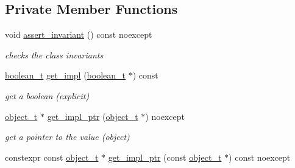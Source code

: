 \subsection*{Private Member Functions}
\begin{DoxyCompactItemize}
\item 
void \mbox{\hyperlink{classnlohmann_1_1basic__json_a4a82d3fb7a111641decf35c2fb707c7f}{assert\+\_\+invariant}} () const noexcept
\begin{DoxyCompactList}\small\item\em checks the class invariants \end{DoxyCompactList}\item 
\mbox{\label{classnlohmann_1_1basic__json_ac686d87a2261f85f1df97035b14a6e3a}} 
\mbox{\hyperlink{classnlohmann_1_1basic__json_a4c919102a9b4fe0d588af64801436082}{boolean\+\_\+t}} \mbox{\hyperlink{classnlohmann_1_1basic__json_ac686d87a2261f85f1df97035b14a6e3a}{get\+\_\+impl}} (\mbox{\hyperlink{classnlohmann_1_1basic__json_a4c919102a9b4fe0d588af64801436082}{boolean\+\_\+t}} $\ast$) const
\begin{DoxyCompactList}\small\item\em get a boolean (explicit) \end{DoxyCompactList}\item 
\mbox{\label{classnlohmann_1_1basic__json_a58b65f595883fb93333423ec5e3bafee}} 
\mbox{\hyperlink{classnlohmann_1_1basic__json_a5e48a7893520e1314bf0c9723e26ea2a}{object\+\_\+t}} $\ast$ \mbox{\hyperlink{classnlohmann_1_1basic__json_a58b65f595883fb93333423ec5e3bafee}{get\+\_\+impl\+\_\+ptr}} (\mbox{\hyperlink{classnlohmann_1_1basic__json_a5e48a7893520e1314bf0c9723e26ea2a}{object\+\_\+t}} $\ast$) noexcept
\begin{DoxyCompactList}\small\item\em get a pointer to the value (object) \end{DoxyCompactList}\item 
\mbox{\label{classnlohmann_1_1basic__json_aff66aa31ef8603d799433b26fe7535c9}} 
constexpr const \mbox{\hyperlink{classnlohmann_1_1basic__json_a5e48a7893520e1314bf0c9723e26ea2a}{object\+\_\+t}} $\ast$ \mbox{\hyperlink{classnlohmann_1_1basic__json_aff66aa31ef8603d799433b26fe7535c9}{get\+\_\+impl\+\_\+ptr}} (const \mbox{\hyperlink{classnlohmann_1_1basic__json_a5e48a7893520e1314bf0c9723e26ea2a}{object\+\_\+t}} $\ast$) const noexcept

\end{DoxyCompactItemize}
